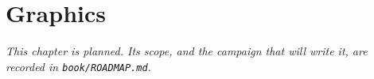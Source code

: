 \chapter{Graphics}
\label{ch:graphics}

\emph{This chapter is planned. Its scope, and the campaign that will write
it, are recorded in \texttt{book/ROADMAP.md}.}
